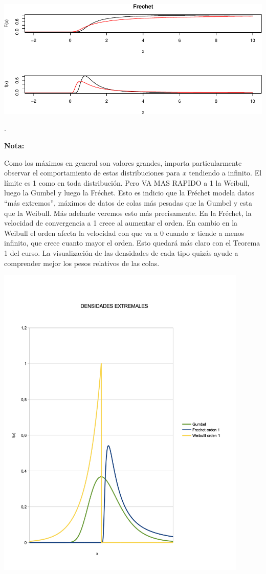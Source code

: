 \documentclass[
  oneside]{article}
\begin{document}
\includegraphics{main_files/figure-latex/unnamed-chunk-40-1.pdf}

.

\textbf{Nota:}

Como los máximos en general son valores grandes, importa particularmente
observar el comportamiento de estas distribuciones para \(x\) tendiendo
a infinito. El límite es 1 como en toda distribución. Pero VA MAS RAPIDO
a 1 la Weibull, luego la Gumbel y luego la Fréchet. Esto es indicio que
la Fréchet modela datos ``más extremos'', máximos de datos de colas más
pesadas que la Gumbel y esta que la Weibull. Más adelante veremos esto
más precisamente. En la Fréchet, la velocidad de convergencia a 1 crece
al aumentar el orden. En cambio en la Weibull el orden afecta la
velocidad con que va a 0 cuando \(x\) tiende a menos infinito, que crece
cuanto mayor el orden. Esto quedará más claro con el Teorema 1 del
curso. La visualización de las densidades de cada tipo quizás ayude a
comprender mejor los pesos relativos de las colas.

\newpage

\includegraphics[width=0.9\textwidth,height=\textheight]{images/p0.png}
\newpage
\end{document}
